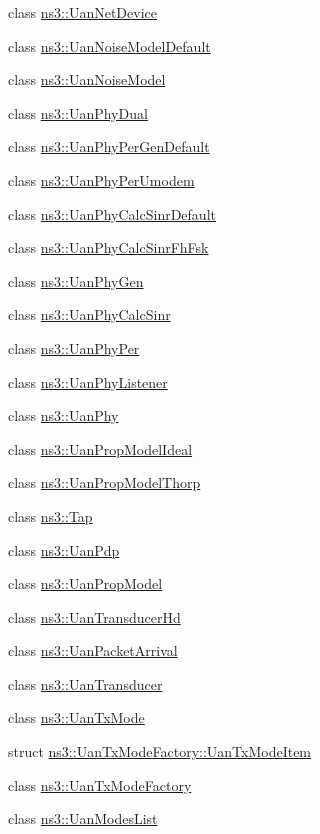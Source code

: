 \begin{DoxyCompactItemize}
\item 
class \hyperlink{classns3_1_1UanNetDevice}{ns3\+::\+Uan\+Net\+Device}
\item 
class \hyperlink{classns3_1_1UanNoiseModelDefault}{ns3\+::\+Uan\+Noise\+Model\+Default}
\item 
class \hyperlink{classns3_1_1UanNoiseModel}{ns3\+::\+Uan\+Noise\+Model}
\item 
class \hyperlink{classns3_1_1UanPhyDual}{ns3\+::\+Uan\+Phy\+Dual}
\item 
class \hyperlink{classns3_1_1UanPhyPerGenDefault}{ns3\+::\+Uan\+Phy\+Per\+Gen\+Default}
\item 
class \hyperlink{classns3_1_1UanPhyPerUmodem}{ns3\+::\+Uan\+Phy\+Per\+Umodem}
\item 
class \hyperlink{classns3_1_1UanPhyCalcSinrDefault}{ns3\+::\+Uan\+Phy\+Calc\+Sinr\+Default}
\item 
class \hyperlink{classns3_1_1UanPhyCalcSinrFhFsk}{ns3\+::\+Uan\+Phy\+Calc\+Sinr\+Fh\+Fsk}
\item 
class \hyperlink{classns3_1_1UanPhyGen}{ns3\+::\+Uan\+Phy\+Gen}
\item 
class \hyperlink{classns3_1_1UanPhyCalcSinr}{ns3\+::\+Uan\+Phy\+Calc\+Sinr}
\item 
class \hyperlink{classns3_1_1UanPhyPer}{ns3\+::\+Uan\+Phy\+Per}
\item 
class \hyperlink{classns3_1_1UanPhyListener}{ns3\+::\+Uan\+Phy\+Listener}
\item 
class \hyperlink{classns3_1_1UanPhy}{ns3\+::\+Uan\+Phy}
\item 
class \hyperlink{classns3_1_1UanPropModelIdeal}{ns3\+::\+Uan\+Prop\+Model\+Ideal}
\item 
class \hyperlink{classns3_1_1UanPropModelThorp}{ns3\+::\+Uan\+Prop\+Model\+Thorp}
\item 
class \hyperlink{classns3_1_1Tap}{ns3\+::\+Tap}
\item 
class \hyperlink{classns3_1_1UanPdp}{ns3\+::\+Uan\+Pdp}
\item 
class \hyperlink{classns3_1_1UanPropModel}{ns3\+::\+Uan\+Prop\+Model}
\item 
class \hyperlink{classns3_1_1UanTransducerHd}{ns3\+::\+Uan\+Transducer\+Hd}
\item 
class \hyperlink{classns3_1_1UanPacketArrival}{ns3\+::\+Uan\+Packet\+Arrival}
\item 
class \hyperlink{classns3_1_1UanTransducer}{ns3\+::\+Uan\+Transducer}
\item 
class \hyperlink{classns3_1_1UanTxMode}{ns3\+::\+Uan\+Tx\+Mode}
\item 
struct \hyperlink{structns3_1_1UanTxModeFactory_1_1UanTxModeItem}{ns3\+::\+Uan\+Tx\+Mode\+Factory\+::\+Uan\+Tx\+Mode\+Item}
\item 
class \hyperlink{classns3_1_1UanTxModeFactory}{ns3\+::\+Uan\+Tx\+Mode\+Factory}
\item 
class \hyperlink{classns3_1_1UanModesList}{ns3\+::\+Uan\+Modes\+List}
\end{DoxyCompactItemize}
